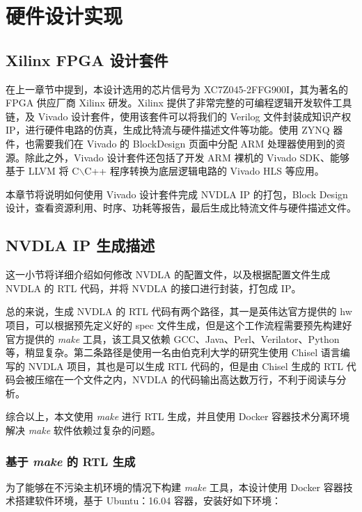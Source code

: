 \chapter{硬件设计实现}\label{chap:hardware}


\section{Xilinx FPGA 设计套件}

在上一章节中提到，本设计选用的芯片信号为 XC7Z045-2FFG900I，其为著名的 FPGA 供应厂商 Xilinx 研发。Xilinx 提供了非常完整的可编程逻辑开发软件工具链，及 Vivado 设计套件，使用该套件可以将我们的 Verilog 文件封装成知识产权 IP，进行硬件电路的仿真，生成比特流与硬件描述文件等功能。使用 ZYNQ 器件，也需要我们在 Vivado 的 BlockDesign 页面中分配 ARM 处理器使用到的资源。除此之外，Vivado 设计套件还包括了开发 ARM 裸机的 Vivado SDK、能够基于 LLVM 将 C$\backslash$C++ 程序转换为底层逻辑电路的 Vivado HLS 等应用。

本章节将说明如何使用 Vivado 设计套件完成 NVDLA IP 的打包，Block Design 设计，查看资源利用、时序、功耗等报告，最后生成比特流文件与硬件描述文件。 

\section{NVDLA IP 生成描述}

这一小节将详细介绍如何修改 NVDLA 的配置文件，以及根据配置文件生成 NVDLA 的 RTL 代码，并将 NVDLA 的接口进行封装，打包成 IP。

总的来说，生成 NVDLA 的 RTL 代码有两个路径，其一是英伟达官方提供的 hw 项目，可以根据预先定义好的 spec 文件生成，但是这个工作流程需要预先构建好官方提供的 \emph{make} 工具，该工具又依赖 GCC、Java、Perl、Verilator、Python 等，稍显复杂。第二条路径是使用一名由伯克利大学的研究生使用 Chisel 语言编写的 NVDLA 项目，其也是可以生成 RTL 代码的，但是由 Chisel 生成的 RTL 代码会被压缩在一个文件之内，NVDLA 的代码输出高达数万行，不利于阅读与分析。

综合以上，本文使用 \emph{make} 进行 RTL 生成，并且使用 Docker 容器技术分离环境解决 \emph{make} 软件依赖过复杂的问题。

\subsection{基于 \emph{make} 的 RTL 生成}

为了能够在不污染主机环境的情况下构建 \emph{make} 工具，本设计使用 Docker 容器技术搭建软件环境，基于 Ubuntu：16.04 容器，安装好如下环境：

